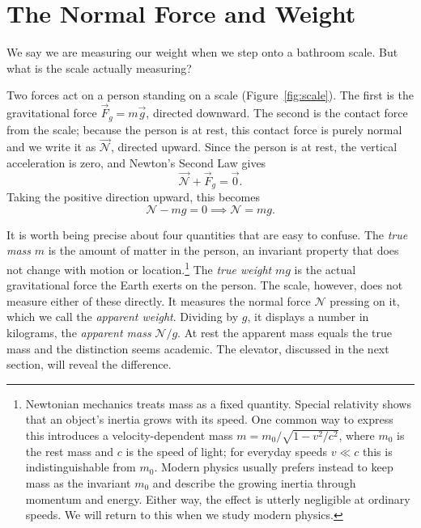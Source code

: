 \section*{The Normal Force and Weight}

We say we are measuring our weight when we step onto a bathroom scale. But what is the scale actually measuring?

Two forces act on a person standing on a scale (Figure~\ref{fig:scale}). The first is the gravitational force $\vec{F}_g = m\vec{g}$, directed downward. The second is the contact force from the scale; because the person is at rest, this contact force is purely normal and we write it as $\vec{\mathscr{N}}$, directed upward. Since the person is at rest, the vertical acceleration is zero, and Newton's Second Law gives
\begin{equation}
    \vec{\mathscr{N}} + \vec{F}_g = \vec{0}.
\end{equation}
Taking the positive direction upward, this becomes
\begin{equation}
    \mathscr{N} - mg = 0 \implies \mathscr{N} = mg.
\end{equation}

It is worth being precise about four quantities that are easy to confuse. The \textit{true mass} $m$ is the amount of matter in the person, an invariant property that does not change with motion or location.\footnote{Newtonian mechanics treats mass as a fixed quantity. Special relativity shows that an object's inertia grows with its speed. One common way to express this
introduces a velocity-dependent mass $m = m_0/\sqrt{1 - v^2/c^2}$, where $m_0$ is the
rest mass and $c$ is the speed of light; for everyday speeds $v \ll c$ this is
indistinguishable from $m_0$. Modern physics usually prefers instead to keep mass as
the invariant $m_0$ and describe the growing inertia through momentum and energy. Either
way, the effect is utterly negligible at ordinary speeds. We will return to this when we
study modern physics.} The \textit{true weight} $mg$ is the actual gravitational force the Earth exerts on the person. The scale, however, does not measure either of these directly. It measures the normal force $\mathscr{N}$ pressing on it, which we call the \textit{apparent weight}. Dividing by $g$, it displays a number in kilograms, the \textit{apparent mass} $\mathscr{N}/g$. At rest the apparent mass equals the true mass and the distinction seems academic. The elevator, discussed in the next section, will reveal the difference.

